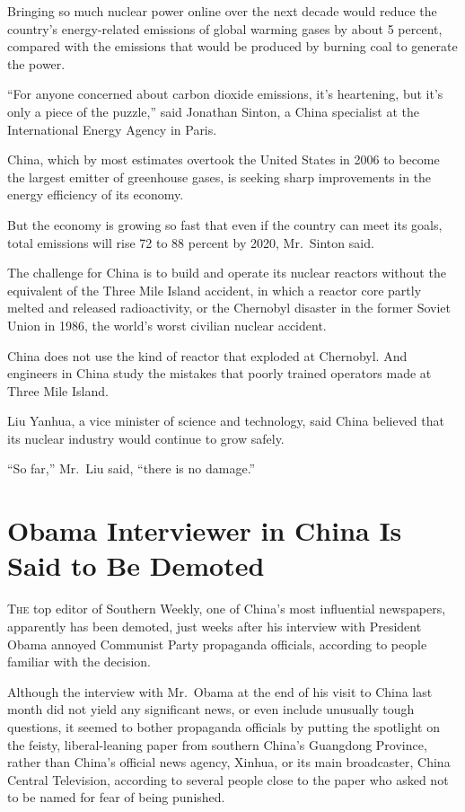 ﻿\documentclass[12pt]{article}
\begin{document}
Bringing so much nuclear power online over the next decade would reduce the country's energy-related
emissions of global warming gases by about 5 percent, compared with the emissions that would be
produced by burning coal to generate the power.

``For anyone concerned about carbon dioxide emissions, it's heartening, but it's only a piece of the
puzzle,'' said Jonathan Sinton, a China specialist at the International Energy Agency in Paris.

China, which by most estimates overtook the United States in 2006 to become the largest emitter of
greenhouse gases, is seeking sharp improvements in the energy efficiency of its economy.

But the economy is growing so fast that even if the country can meet its goals, total emissions will
rise 72 to 88 percent by 2020, Mr.~Sinton said.

The challenge for China is to build and operate its nuclear reactors without the equivalent of the
Three Mile Island accident, in which a reactor core partly melted and released radioactivity, or the
Chernobyl disaster in the former Soviet Union in 1986, the world's worst civilian nuclear accident.

China does not use the kind of reactor that exploded at Chernobyl. And engineers in China study the
mistakes that poorly trained operators made at Three Mile Island.

Liu Yanhua, a vice minister of science and technology, said China believed that its nuclear industry
would continue to grow safely.

``So far,'' Mr.~Liu said, ``there is no damage.''

\section{Obama Interviewer in China Is Said to Be Demoted}

\lettrine{T}{he} top editor of Southern Weekly, one of China's most
influential newspapers, apparently has been demoted, just weeks after his interview with President
Obama annoyed Communist Party propaganda officials, according to people familiar with the decision.

Although the interview with Mr.~Obama at the end of his visit to China last month did not yield any
significant news, or even include unusually tough questions, it seemed to bother propaganda
officials by putting the spotlight on the feisty, liberal-leaning paper from southern China's
Guangdong Province, rather than China's official news agency, Xinhua, or its main broadcaster, China
Central Television, according to several people close to the paper who asked not to be named for
fear of being punished.
\end{document}
